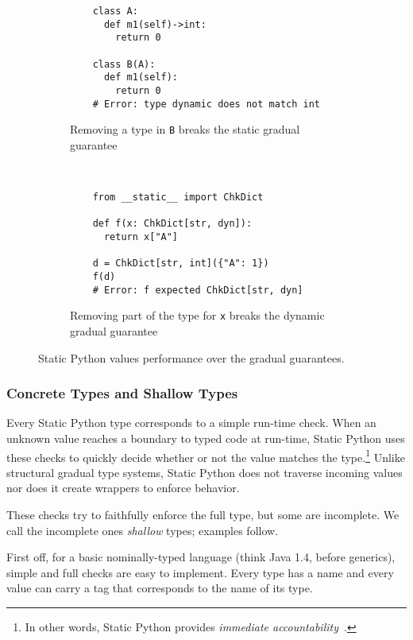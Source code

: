 \documentclass[english,cleveref,submission]{programming}
\newcommand{\SP}{Static Python}
\newcommand{\code}[1]{\texttt{#1}}
\begin{document}
\begin{figure}
  \begin{subfigure}[t]{0.5\columnwidth}
  \begin{verbatim}
    class A:
      def m1(self)->int:
        return 0

    class B(A):
      def m1(self):
        return 0
    # Error: type dynamic does not match int
  \end{verbatim}
    \caption{Removing a type in \code{B} breaks the static gradual guarantee}
    \label{f:gg-failure-stat}
  \end{subfigure}
  ~
  \begin{subfigure}[t]{0.5\columnwidth}
  \begin{verbatim}
    from __static__ import ChkDict

    def f(x: ChkDict[str, dyn]):
      return x["A"]

    d = ChkDict[str, int]({"A": 1})
    f(d)
    # Error: f expected ChkDict[str, dyn]
  \end{verbatim}
    \caption{Removing part of the type for \code{x} breaks the dynamic gradual guarantee}
    \label{f:gg-failure-dyn}
  \end{subfigure}
  \caption{\SP{} values performance over the gradual guarantees.}
  \label{fig:gg-failure}
\end{figure}


\subsubsection{Concrete Types and Shallow Types}
\label{s:checked-type}

Every \SP{} type corresponds to a simple run-time check.
When an unknown value reaches a boundary to typed code at run-time,
\SP{} uses these checks to quickly decide whether or not the value
matches the type.\footnote{In other words, \SP{} provides \emph{immediate accountability}~\cite{mt-oopsla-2017}.}
Unlike structural gradual type systems, \SP{} does not traverse
incoming values nor does it create wrappers to enforce behavior.

These checks try to faithfully enforce the full type, but some are incomplete.
We call the incomplete ones \emph{shallow} types; examples follow.

First off, for a basic nominally-typed language (think Java 1.4, before
generics), simple and full checks are easy to implement.
Every type has a name and every value can carry a tag that corresponds to the
name of its type.
\end{document}
